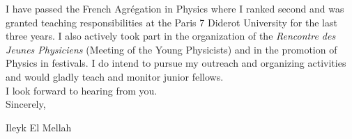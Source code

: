 \documentclass[12pt]{letter}
\begin{document}
\begin{letter} {}
\hspace*{0.5cm} I have passed the French Agr\'egation in Physics where I ranked second and was granted teaching responsibilities at the Paris 7 Diderot University for the last three years. I also actively took part in the organization of the \textit{Rencontre des Jeunes Physiciens} (Meeting of the Young Physicists) and in the promotion of Physics in festivals. I do intend to pursue my outreach and organizing activities and would gladly teach and monitor junior fellows.\\
\hspace*{0.5cm} I look forward to hearing from you.\\
 
Sincerely,
 
\closing{Ileyk E{\sc l Mellah}} 


  \end{letter}
  
  
 
\end{document}
